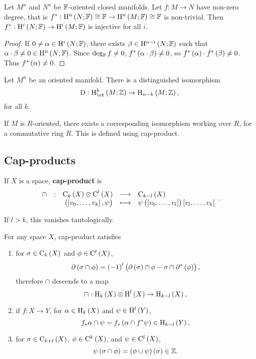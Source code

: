 \begin{corollary}
Let $ M^n $ and $ N^n $ be $ \mathbb{F} $-oriented closed manifolds. Let $ f : M \to N $ have non-zero degree, that is $ f^* : \H^n\br{N; \FF} \cong \FF \to \H^n\br{M; \FF} \cong \FF $ is non-trivial. Then $ f^* : \H^i\br{N; \FF} \to \H^i\br{M; \FF} $ is injective for all $ i $.
\end{corollary}

\begin{proof}
If $ 0 \ne \alpha \in \H^i\br{N; \FF} $, there exists $ \beta \in \H^{n - i}\br{N; \FF} $ such that $ \alpha \cdot \beta \ne 0 \in \H^n\br{N; \FF} $. Since $ \deg_{\mathbb{F}} f \ne 0 $, $ f^*\br{\alpha \cdot \beta} \ne 0 $, so $ f^*\br{\alpha} \cdot f^*\br{\beta} \ne 0 $. Thus $ f^*\br{\alpha} \ne 0 $.
\end{proof}

\begin{theorem}
\label{thm:poincareduality}
Let $ M^n $ be an oriented manifold. There is a distinguished isomorphism
$$ \D : \Hc^k\br{M; \ZZ} \to \H_{n - k}\br{M; \ZZ}, $$
for all $ k $.
\end{theorem}

If $ M $ is $ R $-oriented, there exists a corresponding isomorphism working over $ R $, for a commutative ring $ R $. This is defined using cap-product.

\pagebreak

\subsection{Cap-products}

\begin{definition*}
If $ X $ is a space, \textbf{cap-product} is
$$ \function[\cap]{\C_k\br{X} \otimes \C^l\br{X}}{\C_{k - l}\br{X}}{\br{\sbr{v_0, \dots, v_k}, \psi}}{\psi\br{\sbr{v_0, \dots, v_l}}\sbr{v_l, \dots, v_k}}. $$
\end{definition*}

If $ l > k $, this vanishes tautologically.

\begin{lemma}
For any space $ X $, cap-product satisfies
\begin{enumerate}
\item for $ \sigma \in \C_k\br{X} $ and $ \phi \in \C^l\br{X} $,
$$ \da\br{\sigma \cap \phi} = \br{-1}^l\br{\da\br{\sigma} \cap \phi - \sigma \cap \da^*\br{\phi}}, $$
therefore $ \cap $ descends to a map
$$ \cap : \H_k\br{X} \otimes \H^l\br{X} \to \H_{k - l}\br{X}, $$
\item if $ f : X \to Y $, for $ \alpha \in \H_k\br{X} $ and $ \psi \in \H^l\br{Y} $,
$$ f_*\alpha \cap \psi = f_*\br{\alpha \cap f^*\psi} \in \H_{k - l}\br{Y}, $$
\item for $ \sigma \in \C_{k + l}\br{X} $, $ \phi \in \C^k\br{X} $, and $ \psi \in \C^l\br{X} $,
$$ \psi\br{\sigma \cap \phi} = \br{\phi \cup \psi}\br{\sigma} \in \ZZ. $$
\end{enumerate}
\end{lemma}

